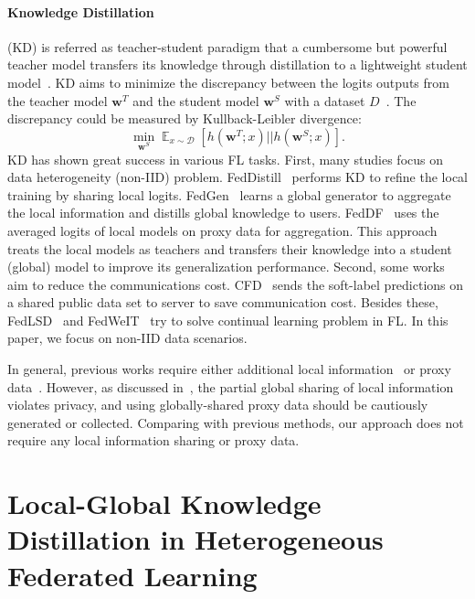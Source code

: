 \documentclass{article} %
\newcommand{\w}{\boldsymbol{w}}
\DeclareMathOperator{\E}{\mathbb{E}}
\newcommand{\system}{\textsc{FedGKD}\xspace}
\begin{document}
\paragraph{Knowledge Distillation}(KD) is referred as teacher-student paradigm that a cumbersome but powerful teacher model transfers its knowledge through distillation to a lightweight student model~\citep{buci2006model}. KD aims to minimize the discrepancy between the logits outputs from the teacher model $\w^T$ and the student model $\w^S$ with a dataset $D$~\citep{hinton2015distilling}.
The discrepancy could be measured by Kullback-Leibler divergence:
\begin{equation}
    \min_{\w^S} \E_{x \sim \mathcal{D}}[h(\w^T;x)||h(\w^S;x)]. \label{eq:kl}
\end{equation}
KD has shown great success in various FL tasks. First, many studies focus on data heterogeneity (non-IID) problem. 
FedDistill~\citep{seo2020federated} performs KD to refine the local training by sharing local logits. 
FedGen~\citep{zhu2021data} learns a global generator to aggregate the local information and distills global knowledge to users. 
FedDF~\citep{lin2020ensemble} uses the averaged logits of local models on proxy data for aggregation. This approach treats the local models as teachers and transfers their knowledge into a student (global) model to improve its generalization performance. 
Second, some works aim to reduce the communications cost. CFD~\citep{sattler2020communication} sends the soft-label predictions on a shared public data set to server to save communication cost. 
Besides these, FedLSD~\citep{lee2021preservation} and FedWeIT~\citep{yoon2021federated} try to solve continual learning problem in FL. In this paper, we focus on non-IID data scenarios.

In general, previous works require either additional local information~\citep{seo2020federated,zhu2021data} or proxy data~\citep{lin2020ensemble,sattler2021fedaux,sattler2020communication}. However, as discussed in~\citep{mcmahan2017communication,bonawitz2017practical,li2018federated}, the partial global sharing of local information violates privacy, and using globally-shared proxy data should be cautiously generated or collected. Comparing with previous methods, our approach does not require any local information sharing or proxy data.


\section{Local-Global Knowledge Distillation in Heterogeneous Federated Learning}
\end{document}
